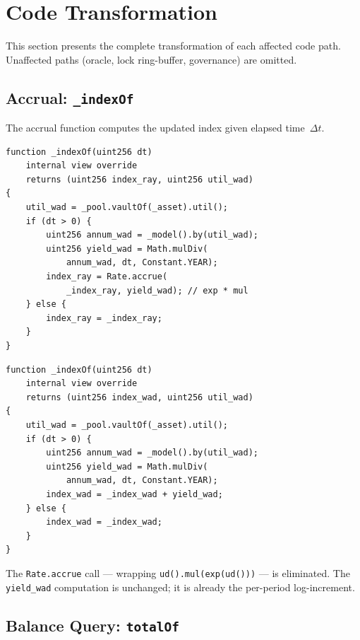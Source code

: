 \documentclass[10pt,a4paper,twocolumn]{article}
\theoremstyle{definition}
\theoremstyle{plain}
\theoremstyle{remark}
\begin{document}
\section{Code Transformation}
\label{sec:transformation}

This section presents the complete transformation of each affected code path. Unaffected paths (oracle, lock ring-buffer, governance) are omitted.

\subsection{Accrual: \texttt{\_indexOf}}
\label{subsec:indexof}

The accrual function computes the updated index given elapsed time~$\Delta t$.

\begin{lstlisting}[language=Solidity, caption={Multiplicative accrual (before)}, label={lst:indexof-ray}]
function _indexOf(uint256 dt)
    internal view override
    returns (uint256 index_ray, uint256 util_wad)
{
    util_wad = _pool.vaultOf(_asset).util();
    if (dt > 0) {
        uint256 annum_wad = _model().by(util_wad);
        uint256 yield_wad = Math.mulDiv(
            annum_wad, dt, Constant.YEAR);
        index_ray = Rate.accrue(
            _index_ray, yield_wad); // exp * mul
    } else {
        index_ray = _index_ray;
    }
}
\end{lstlisting}

\begin{lstlisting}[language=Solidity, caption={Log-space accrual (after)}, label={lst:indexof-log}]
function _indexOf(uint256 dt)
    internal view override
    returns (uint256 index_wad, uint256 util_wad)
{
    util_wad = _pool.vaultOf(_asset).util();
    if (dt > 0) {
        uint256 annum_wad = _model().by(util_wad);
        uint256 yield_wad = Math.mulDiv(
            annum_wad, dt, Constant.YEAR);
        index_wad = _index_wad + yield_wad;
    } else {
        index_wad = _index_wad;
    }
}
\end{lstlisting}

The \texttt{Rate.accrue} call --- wrapping \texttt{ud().mul(exp(ud()))} --- is eliminated. The \texttt{yield\_wad} computation is unchanged; it is already the per-period log-increment.

\subsection{Balance Query: \texttt{totalOf}}
\label{subsec:totalof}
\end{document}
